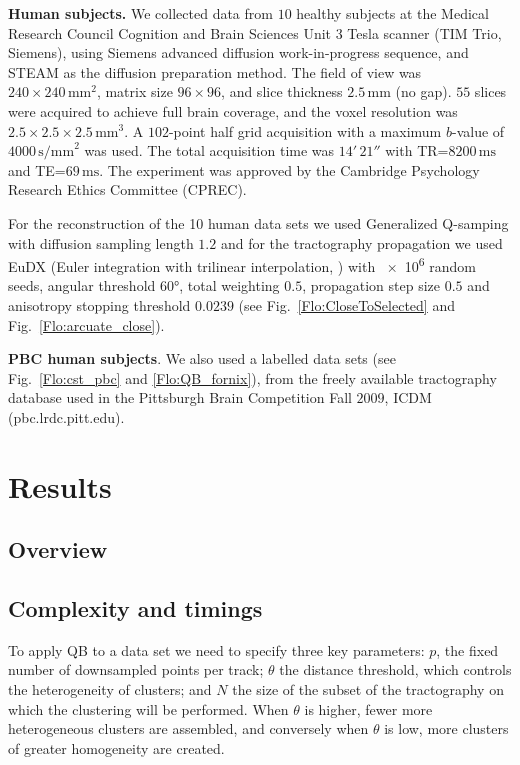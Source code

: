 \documentclass[journal]{IEEEtran}
\begin{document}
\textbf{Human subjects.} We collected data from $10$ healthy subjects at
the Medical Research Council Cognition and Brain Sciences Unit 3 Tesla scanner
(TIM Trio, Siemens), using Siemens advanced diffusion work-in-progress sequence,
and STEAM \cite{merboldt1992diffusion,MAB04} as the diffusion preparation
method. The field of view was $240\times240\,\textrm{mm}^{2}$, matrix size
$96\times96$, and slice thickness $2.5\,\textrm{mm}$ (no gap).  $55$ slices were
acquired to achieve full brain coverage, and the voxel resolution was
$2.5\times2.5\times2.5\,\textrm{mm}^{3}$. A $102$-point half grid acquisition
\cite{Yeh2010} with a maximum $b$-value of $4000\, \textrm{s/mm}^{2}$ was used.
The total acquisition time was $14'\,21''$ with TR=$8200\,\textrm{ms}$ and
TE=$69\,\textrm{ms}$. The experiment was approved by the Cambridge Psychology
Research Ethics Committee (CPREC).

For the reconstruction of the 10 human data sets we used Generalized
Q-samping \cite{Yeh2010} with diffusion sampling length $1.2$ and for
the tractography propagation we used EuDX (Euler integration with
trilinear interpolation, \cite{Garyfallidis_thesis}) with \num{e6}
random seeds, angular threshold \ang{60}, total weighting $0.5$,
propagation step size $0.5$ and anisotropy stopping threshold $0.0239$
(see Fig.~\ref{Flo:CloseToSelected} and Fig.~\ref{Flo:arcuate_close}).

\textbf{PBC human subjects}. We also used a labelled data sets (see
Fig.~\ref{Flo:cst_pbc} and \ref{Flo:QB_fornix}), from the freely available
tractography database used in the Pittsburgh Brain Competition Fall
$2009$, ICDM (pbc.lrdc.pitt.edu).

\section{Results}

\subsection{Overview}

\subsection{Complexity and timings\label{sub:Complexity}}

To apply QB to a data set we need to specify three key parameters:
$p$, the fixed number of downsampled points per track; $\theta$
the distance threshold, which controls the heterogeneity of clusters;
and $N$ the size of the subset of the tractography on which the clustering
will be performed. When $\theta$ is higher, fewer more heterogeneous
clusters are assembled, and conversely when $\theta$ is low, more
clusters of greater homogeneity are created.
\end{document}
